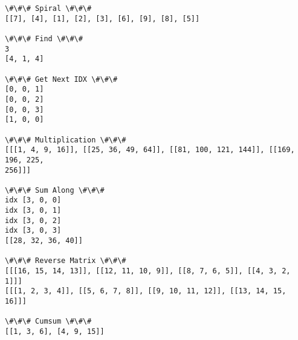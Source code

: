 \documentclass[9pt]{article}
\begin{document}
\begin{Verbatim}[commandchars=\\\{\}]
\#\#\# Spiral \#\#\#
[[7], [4], [1], [2], [3], [6], [9], [8], [5]]

\#\#\# Find \#\#\#
3
[4, 1, 4]

\#\#\# Get Next IDX \#\#\#
[0, 0, 1]
[0, 0, 2]
[0, 0, 3]
[1, 0, 0]

\#\#\# Multiplication \#\#\#
[[[1, 4, 9, 16]], [[25, 36, 49, 64]], [[81, 100, 121, 144]], [[169, 196, 225,
256]]]

\#\#\# Sum Along \#\#\#
idx [3, 0, 0]
idx [3, 0, 1]
idx [3, 0, 2]
idx [3, 0, 3]
[[28, 32, 36, 40]]

\#\#\# Reverse Matrix \#\#\#
[[[16, 15, 14, 13]], [[12, 11, 10, 9]], [[8, 7, 6, 5]], [[4, 3, 2, 1]]]
[[[1, 2, 3, 4]], [[5, 6, 7, 8]], [[9, 10, 11, 12]], [[13, 14, 15, 16]]]

\#\#\# Cumsum \#\#\#
[[1, 3, 6], [4, 9, 15]]
    \end{Verbatim}


    
    
    
\end{document}
